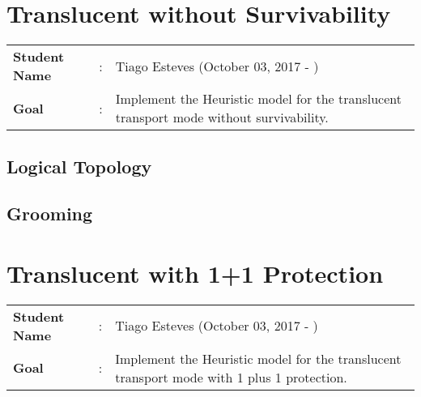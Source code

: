 \clearpage

\section{Translucent without Survivability}
\begin{tcolorbox}	
\begin{tabular}{p{2.75cm} p{0.2cm} p{10.5cm}} 	
\textbf{Student Name}  &:& Tiago Esteves    (October 03, 2017 - )\\
\textbf{Goal}          &:& Implement the Heuristic model for the translucent transport mode without survivability.
\end{tabular}
\end{tcolorbox}

\subsection{Logical Topology}

\subsection{Grooming}


\newpage
\section{Translucent with 1+1 Protection}
\begin{tcolorbox}	
\begin{tabular}{p{2.75cm} p{0.2cm} p{10.5cm}} 	
\textbf{Student Name}  &:& Tiago Esteves    (October 03, 2017 - )\\
\textbf{Goal}          &:& Implement the Heuristic model for the translucent transport mode with 1 plus 1 protection.
\end{tabular}
\end{tcolorbox}
